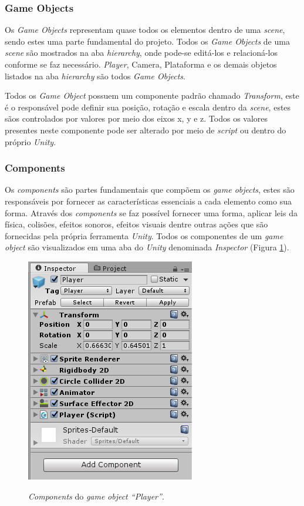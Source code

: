 \documentclass[
	12pt,				%
    oneside,			%
	a4paper,			%
	english,			%
	french,				%
	spanish,			%
	brazil,				%
	]{abntex2}
\begin{document}
				
			\subsubsection{Game Objects}
				Os \textit{Game Objects} representam quase todos os elementos dentro de uma \textit{scene}, sendo estes uma parte fundamental do projeto. Todos os \textit{Game Objects} de uma \textit{scene} são mostrados na aba \textit{hierarchy}, onde pode-se editá-los e relacioná-los  conforme se faz necessário. \textit{Player}, Camera, Plataforma e os demais objetos listados na aba \textit{hierarchy} são todos \textit{Game Objects}.			
				
				Todos os \textit{Game Object} possuem um componente padrão chamado \textit{Transform}, este é o responsável pode definir sua posição, rotação e escala dentro da \textit{scene}, estes sãos controlados por valores por meio dos eixos x, y e z. Todos os valores presentes neste componente pode ser alterado por meio de \textit{script} ou dentro do próprio \textit{Unity}.
				
			\subsubsection{Components}
				Os \textit{components} são partes fundamentais que compõem os \textit{game objects}, estes são responsáveis por fornecer as características essenciais a cada elemento como sua forma. Através dos \textit{components} se faz possível fornecer uma forma, aplicar leis da física, colisões, efeitos sonoros, efeitos visuais dentre outras ações que são fornecidas pela própria ferramenta \textit{Unity}. Todos os componentes de um \textit{game object} são visualizados em uma aba do \textit{Unity} denominada \textit{Inspector}  (Figura \ref{fig:11}).
				
				\begin{figure}[H]
					\caption{\textit{Components} do \textit{game} \textit{object “Player”}.}
					\centering
					\includegraphics[width=0.5\linewidth]{Imagens/11}
					\label{fig:11}
				\end{figure}
			
\end{document}
